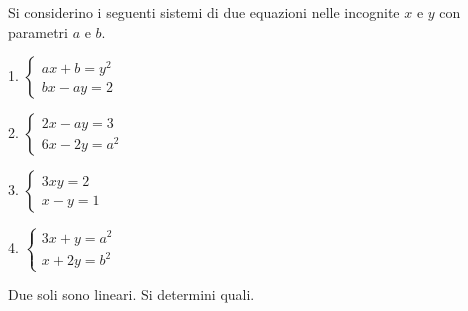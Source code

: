 Si considerino i seguenti sistemi di due equazioni nelle incognite 
$x$ e $y$ con parametri $a$ e $b$.

1. $\displaystyle
\left\{
\begin{array}{l}
\displaystyle ax + b = y^2 \\
\displaystyle bx - ay = 2
\end{array}
\right.
$

 
2. $\displaystyle
\left\{
\begin{array}{l}
\displaystyle 2x - ay = 3 \\
\displaystyle 6x - 2y = a^2
\end{array}
\right.
$

 
3. $\displaystyle
\left\{
\begin{array}{l}
\displaystyle 3xy = 2 \\
\displaystyle x-y = 1
\end{array}
\right.
$

 
4. $\displaystyle
\left\{
\begin{array}{l}
\displaystyle 3x + y = a^2 \\
\displaystyle x + 2y = b^2
\end{array}
\right.
$

Due soli sono lineari. Si determini quali.
